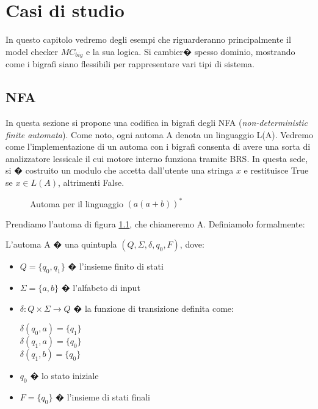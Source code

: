 \chapter{Casi di studio}\label{ch:examples}
In questo capitolo vedremo degli esempi che riguarderanno principalmente il model checker $MC_{big}$ e la sua logica. Si cambier� spesso dominio, mostrando come i bigrafi siano flessibili per rappresentare vari tipi di sistema.

\section{NFA}\label{sec:nfa}
In questa sezione si propone una codifica in bigrafi degli NFA (\emph{non-deterministic finite automata}). Come noto, ogni automa A denota un linguaggio L(A). Vedremo come l'implementazione di un automa con i bigrafi consenta di avere una sorta di analizzatore lessicale il cui motore interno funziona tramite BRS. In questa sede, si � costruito un modulo che accetta dall'utente una stringa $x$ e restituisce True se $x \in L(A)$, altrimenti False.


\begin{figure}[th]
\centering
{}
\caption{Automa per il linguaggio $(a(a+b))^*$ \label{fig:automa1}}
\end{figure}


Prendiamo l'automa di figura \ref{fig:automa1}, che chiameremo A. Definiamolo formalmente:
\begin{prop}
L'automa A � una quintupla $(Q,\Sigma,\delta,q_0,F)$, dove:
\begin{itemize}
	\item
	$Q=\{q_0,q_1\}$ � l'insieme finito di stati
	\item
	$\Sigma = \{a,b\}$ � l'alfabeto di input
	\item
	$\delta : Q \times \Sigma \to Q$ � la funzione di transizione definita come:
		\begin{center}
		$\delta(q_0,a)=\{q_1\}$\\
		$\delta(q_1,a)=\{q_0\}$\\
		$\delta(q_1,b)=\{q_0\}$
		\end{center}
	\item
	$q_0$ � lo stato iniziale
	\item
	$F=\{q_0\}$ � l'insieme di stati finali
\end{itemize}
\end{prop}


